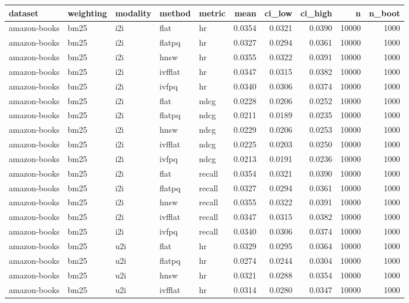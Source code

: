 \begin{tabular}{lllllrrrrr}
\toprule
dataset & weighting & modality & method & metric & mean & ci_low & ci_high & n & n_boot \\
\midrule
amazon-books & bm25 & i2i & flat & hr & 0.0354 & 0.0321 & 0.0390 & 10000 & 1000 \\
amazon-books & bm25 & i2i & flatpq & hr & 0.0327 & 0.0294 & 0.0361 & 10000 & 1000 \\
amazon-books & bm25 & i2i & hnsw & hr & 0.0355 & 0.0322 & 0.0391 & 10000 & 1000 \\
amazon-books & bm25 & i2i & ivfflat & hr & 0.0347 & 0.0315 & 0.0382 & 10000 & 1000 \\
amazon-books & bm25 & i2i & ivfpq & hr & 0.0340 & 0.0306 & 0.0374 & 10000 & 1000 \\
amazon-books & bm25 & i2i & flat & ndcg & 0.0228 & 0.0206 & 0.0252 & 10000 & 1000 \\
amazon-books & bm25 & i2i & flatpq & ndcg & 0.0211 & 0.0189 & 0.0235 & 10000 & 1000 \\
amazon-books & bm25 & i2i & hnsw & ndcg & 0.0229 & 0.0206 & 0.0253 & 10000 & 1000 \\
amazon-books & bm25 & i2i & ivfflat & ndcg & 0.0225 & 0.0203 & 0.0250 & 10000 & 1000 \\
amazon-books & bm25 & i2i & ivfpq & ndcg & 0.0213 & 0.0191 & 0.0236 & 10000 & 1000 \\
amazon-books & bm25 & i2i & flat & recall & 0.0354 & 0.0321 & 0.0390 & 10000 & 1000 \\
amazon-books & bm25 & i2i & flatpq & recall & 0.0327 & 0.0294 & 0.0361 & 10000 & 1000 \\
amazon-books & bm25 & i2i & hnsw & recall & 0.0355 & 0.0322 & 0.0391 & 10000 & 1000 \\
amazon-books & bm25 & i2i & ivfflat & recall & 0.0347 & 0.0315 & 0.0382 & 10000 & 1000 \\
amazon-books & bm25 & i2i & ivfpq & recall & 0.0340 & 0.0306 & 0.0374 & 10000 & 1000 \\
amazon-books & bm25 & u2i & flat & hr & 0.0329 & 0.0295 & 0.0364 & 10000 & 1000 \\
amazon-books & bm25 & u2i & flatpq & hr & 0.0274 & 0.0244 & 0.0304 & 10000 & 1000 \\
amazon-books & bm25 & u2i & hnsw & hr & 0.0321 & 0.0288 & 0.0354 & 10000 & 1000 \\
amazon-books & bm25 & u2i & ivfflat & hr & 0.0314 & 0.0280 & 0.0347 & 10000 & 1000 \\

\end{tabular}
